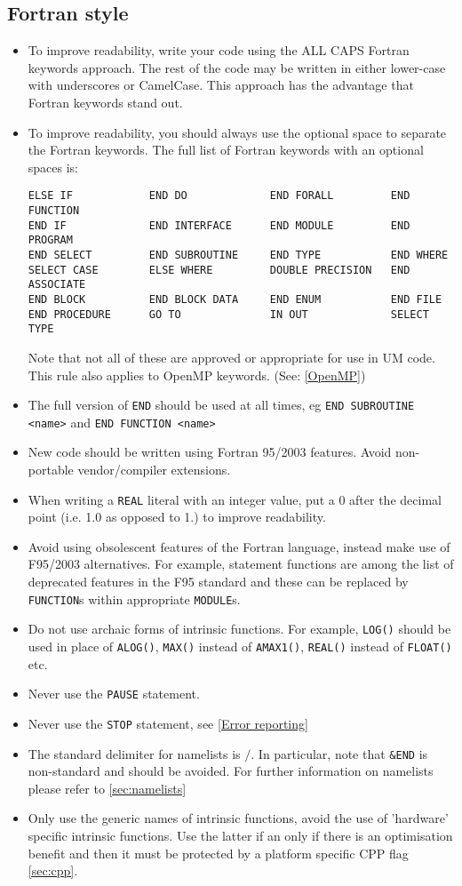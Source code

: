 \subsection{Fortran style}\label{sec:fortstyle}
\begin{itemize}
\item To improve readability, write your code using the
ALL CAPS Fortran keywords approach.
The rest of the code may be written in either lower-case with underscores or
CamelCase. This approach has the advantage that Fortran keywords stand out.
\item  To improve readability, you should always use the optional
space to separate the Fortran keywords. The full list of Fortran keywords with
 an optional spaces is:
\begin{verbatim}
ELSE IF            END DO             END FORALL         END FUNCTION
END IF             END INTERFACE      END MODULE         END PROGRAM
END SELECT         END SUBROUTINE     END TYPE           END WHERE
SELECT CASE        ELSE WHERE         DOUBLE PRECISION   END ASSOCIATE
END BLOCK          END BLOCK DATA     END ENUM           END FILE
END PROCEDURE      GO TO              IN OUT             SELECT TYPE
\end{verbatim}
Note that not all of these are approved or appropriate for use in UM code.
This rule also applies to OpenMP keywords. (See: \ref{OpenMP})
\item The full version of \verb|END| should be used at all times,
eg \verb|END SUBROUTINE <name>| and \verb|END FUNCTION <name>|


\item New code should be written using Fortran 95/2003 features.
 Avoid non-portable vendor/compiler extensions.
\item When writing a \verb|REAL| literal with an integer value,
put a 0 after the decimal point (i.e. 1.0 as opposed to 1.)
to improve readability.
\item Avoid using obsolescent features of the Fortran language,
instead make use of F95/2003 alternatives.
For example, statement functions are among the list of deprecated features in the F95 standard and
these can be replaced by \verb|FUNCTION|s within appropriate \verb|MODULE|s.
\item Do not use archaic forms of intrinsic functions. For example,
\verb|LOG()| should be used in place of \verb|ALOG()|, \verb|MAX()| instead
of \verb|AMAX1()|, \verb|REAL()| instead of \verb|FLOAT()| etc.
\item Never use the \verb|PAUSE| statement.
\item Never use the \verb|STOP| statement, see \ref{Error reporting}
\item The standard delimiter for namelists is $ \slash $.
In particular, note that \verb|&END| is non-standard and should be avoided. For
further information on namelists please refer to \ref{sec:namelists}
\item Only use the generic names of intrinsic functions, avoid the use of 'hardware' specific
intrinsic functions. Use the latter if an only if there is an optimisation benefit and then
it must be protected by a platform specific CPP flag \ref{sec:cpp}.


\end{itemize}
